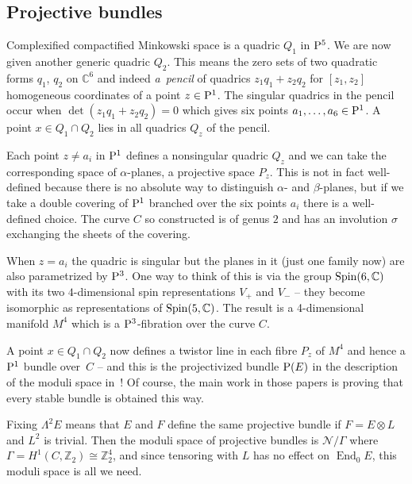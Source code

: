 \documentclass[pdftex]{sigma}
\numberwithin{equation}{section}
\begin{document}
\subsection{Projective bundles}
Complexified compactified Minkowski space is a quadric $Q_1$ in ${\rm P}^5$. We are now given another generic quadric $Q_2$. This means the zero sets of two quadratic forms $q_1$, $q_2$ on ${\mathbb C}^6$ and indeed {\it a~pencil} of quadrics $z_1q_1+z_2q_2$ for $[z_1,z_2]$ homogeneous coordinates of a point $z\in {\rm P}^1$. The singular quadrics in the pencil occur when $\det (z_1q_1+z_2q_2)=0$ which gives six points \mbox{$a_1,\dots, a_6\in {\rm P}^1$}. A point $x\in Q_1\cap Q_2$ lies in all quadrics $Q_z$ of the pencil.

Each point $z\ne a_i$ in ${\rm P}^1$ defines a nonsingular quadric $Q_z$ and we can take the corresponding space of $\alpha$-planes, a projective space $P_z$. This is not in fact well-defined because there is no absolute way to distinguish $\alpha$- and $\beta$-planes, but if we take a double covering of ${\rm P}^1$ branched over the six points $a_i$ there is a well-defined choice. The curve $C$ so constructed is of genus $2$ and has an involution $\sigma$ exchanging the sheets of the covering.

When $z=a_i$ the quadric is singular but the planes in it (just one family now) are also parametrized by ${\rm P}^3$. One way to think of this is via the group ${\rm Spin}(6,{\mathbb C})$ with its two $4$-dimensional spin representations $V_+$ and $V_-$ -- they become isomorphic as representations of ${\rm Spin}(5,{\mathbb C})$. The result is a 4-dimensional manifold $M^4$ which is a ${\rm P}^3$-fibration over the curve $C$.

A point $x\in Q_1\cap Q_2$ now defines a twistor line in each fibre $P_z$ of $M^4$ and hence a ${\rm P}^1$ bundle over~$C$ -- and this is the projectivized bundle ${\rm P}(E)$ in the description of the moduli space in~\cite{Narasimhan/Ramanan1969, Newstead}! Of course, the main work in those papers is proving that every stable bundle is obtained this way.

Fixing $\Lambda^2E$ means that $E$ and $F$ define the same projective bundle if $F=E\otimes L$ and $L^2$ is trivial. Then the moduli space of projective bundles is ${\mathcal N}/\Gamma$ where $\Gamma = H^1(C,{\mathbb Z}_2)\cong {\mathbb Z}_2^4$, and since tensoring with $L$ has no effect on $\operatorname{End}_0E$, this moduli space is all we need.
\end{document}
